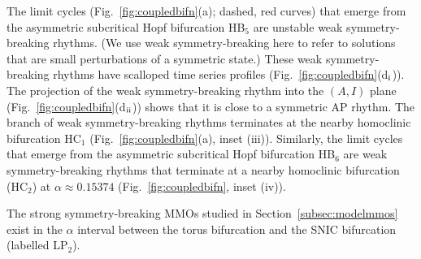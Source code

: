 \documentclass[10pt,onecolumn]{article}
\theoremstyle{plain}
\begin{document}
The limit cycles (Fig.~\ref{fig:coupledbifn}(a); dashed, red curves) that emerge from the asymmetric subcritical Hopf bifurcation HB$_5$ are unstable weak symmetry-breaking rhythms. (We use weak symmetry-breaking here to refer to solutions that are small perturbations of a symmetric state.) These weak symmetry-breaking rhythms have scalloped time series profiles (Fig.~\ref{fig:coupledbifn}(d$_{\rm i}$)). The projection of the weak symmetry-breaking rhythm into the $(A,I)$ plane (Fig.~\ref{fig:coupledbifn}(d$_{\rm ii}$)) shows that it is close to a symmetric AP rhythm. The branch of weak symmetry-breaking rhythms terminates at the nearby homoclinic bifurcation HC$_1$ (Fig.~\ref{fig:coupledbifn}(a), inset (iii)). 
Similarly, the limit cycles that emerge from the asymmetric subcritical Hopf bifurcation HB$_6$ are weak symmetry-breaking rhythms that terminate at a nearby homoclinic bifurcation (HC$_2$) at $\alpha \approx 0.15374$ (Fig.~\ref{fig:coupledbifn}, inset (iv)). 

The strong symmetry-breaking MMOs studied in Section~\ref{subsec:modelmmos} exist in the $\alpha$ interval between the torus bifurcation and the SNIC bifurcation (labelled LP$_2$). 
\end{document}
